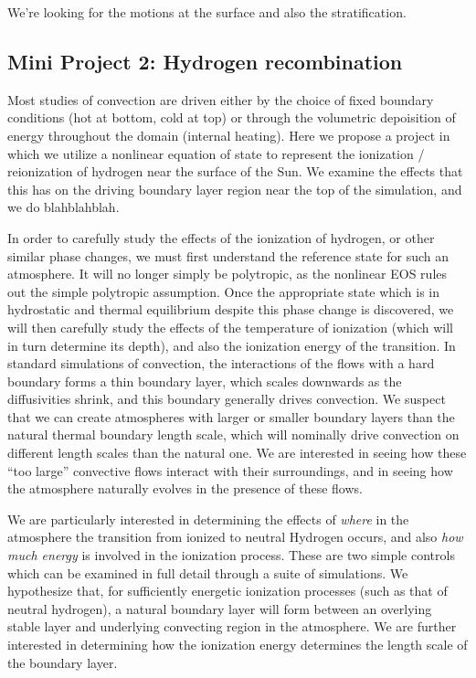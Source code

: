 \documentclass[aps, pre, onecolumn, nofootinbib, notitlepage, groupedaddress, amsfonts, amssymb, amsmath, longbibliography]{revtex4-1}
\begin{document}
We're looking for the motions at the surface and also the stratification.

\subsection{Mini Project 2: Hydrogen recombination}
Most studies of convection are driven either by the choice of fixed boundary conditions
(hot at bottom, cold at top) or through the volumetric depoisition of energy throughout
the domain (internal heating).  Here we propose a project in which we utilize a nonlinear
equation of state to represent the ionization / reionization of hydrogen near the surface of
the Sun.  We examine the effects that this has on the driving boundary layer region near the
top of the simulation, and we do blahblahblah.

In order to carefully study the effects of the ionization of hydrogen, or other similar phase
changes, we must first understand the reference state for such an atmosphere.  It will no longer
simply be polytropic, as the nonlinear EOS rules out the simple polytropic assumption. Once the
appropriate state which is in hydrostatic and thermal equilibrium despite this phase change is discovered,
we will then carefully study the effects of the temperature of ionization (which will in turn
determine its depth), and also the ionization energy of the transition.  In standard simulations
of convection, the interactions of the flows with a hard boundary forms a thin boundary layer,
which scales downwards as the diffusivities shrink, and this boundary generally drives convection.
We suspect that we can create atmospheres with larger or smaller boundary layers than the natural
thermal boundary length scale, which will nominally drive convection on different length scales
than the natural one.  We are interested in seeing how these ``too large'' convective flows
interact with their surroundings, and in seeing how the atmosphere naturally evolves in the presence
of these flows.

We are particularly interested in determining the effects of \emph{where} in the atmosphere the
transition from ionized to neutral Hydrogen occurs, and also \emph{how much energy} is involved in
the ionization process.  These are two simple controls which can be examined in full detail through
a suite of simulations.  We hypothesize that, for sufficiently energetic ionization processes (such as
that of neutral hydrogen), a natural boundary layer will form between an overlying stable layer and
underlying convecting region in the atmosphere.  We are further interested in determining how the
ionization energy determines the length scale of the boundary layer.
\end{document}

